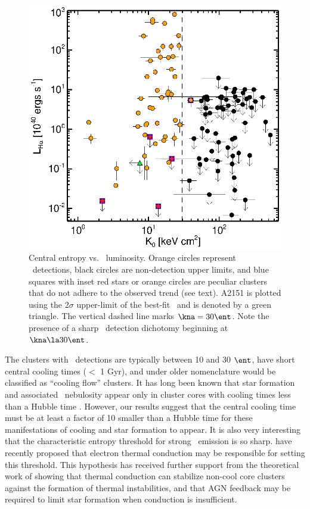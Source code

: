 \begin{figure}
  \begin{center}
    \includegraphics*[width=\columnwidth, trim=28mm 7mm 40mm 17mm, clip]{haradent_f1.eps}
    \caption[\halpha\ luminosity versus core entropy]{Central entropy
    vs. \halpha\ luminosity. Orange circles represent \halpha\
    detections, black circles are non-detection upper limits, and blue
    squares with inset red stars or orange circles are peculiar
    clusters that do not adhere to the observed trend (see
    text). A2151 is plotted using the 2$\sigma$ upper-limit of the
    best-fit \kna\ and is denoted by a green triangle. The vertical
    dashed line marks $\kna = 30 \ent$. Note the presence of a sharp
    \halpha\ detection dichotomy beginning at $\kna \la 30 \ent$.}
    \label{fig:ha}
  \end{center}
\end{figure}

The clusters with \halpha\ detections are typically between 10 and 30
$\ent$, have short central cooling times ($<$ 1 Gyr), and under older
nomenclature would be classified as ``cooling flow'' clusters.  It has
long been known that star formation and associated \halpha\ nebulosity
appear only in cluster cores with cooling times less than a Hubble
time \citep{hu85, johnstone87, mcnamara89, voit97,cardiel98}. However,
our results suggest that the central cooling time must be at least a
factor of 10 smaller than a Hubble time for these manifestations of
cooling and star formation to appear.  It is also very interesting
that the characteristic entropy threshold for strong \halpha\ emission
is so sharp. \cite{conduction} have recently proposed that electron
thermal conduction may be responsible for setting this threshold. This
hypothesis has received further support from the theoretical work of
\cite{2008ApJ...688..859G} showing that thermal conduction can
stabilize non-cool core clusters against the formation of thermal
instabilities, and that AGN feedback may be required to limit star
formation when conduction is insufficient.

